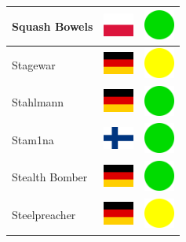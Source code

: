 \documentclass[12pt, a4paper, twoside]{report}
\begin{document}
\begin{center}
\begin{longtable}{|p{5cm}|p{2cm}|p{2cm}|}
 Squash Bowels                                              & \includegraphics[width=1cm]{../img/flags/pl} &   \includegraphics[width=1cm]{../likes/y} \\ \hline
 Stagewar                                                   & \includegraphics[width=1cm]{../img/flags/de} &   \includegraphics[width=1cm]{../likes/m} \\ \hline
 Stahlmann                                                  & \includegraphics[width=1cm]{../img/flags/de} &   \includegraphics[width=1cm]{../likes/y} \\ \hline
 Stam1na                                                    & \includegraphics[width=1cm]{../img/flags/fi} &   \includegraphics[width=1cm]{../likes/y} \\ \hline
 Stealth Bomber                                             & \includegraphics[width=1cm]{../img/flags/de} &   \includegraphics[width=1cm]{../likes/y} \\ \hline
 Steelpreacher                                              & \includegraphics[width=1cm]{../img/flags/de} &   \includegraphics[width=1cm]{../likes/m} \\ \hline

\end{longtable}
\end{center}
\end{document}

